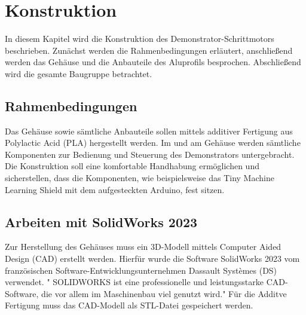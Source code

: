 %
%

\chapter{Konstruktion}
In diesem Kapitel wird die Konstruktion des Demonstrator-Schrittmotors beschrieben. Zunächst werden die Rahmenbedingungen erläutert, anschließend werden das Gehäuse und die Anbauteile des Aluprofils besprochen. Abschließend wird die gesamte Baugruppe betrachtet.

\section{Rahmenbedingungen}
Das Gehäuse sowie sämtliche Anbauteile sollen mittels additiver Fertigung aus Polylactic Acid (PLA) hergestellt werden. Im und am Gehäuse werden sämtliche Komponenten zur Bedienung und Steuerung des Demonstrators untergebracht. Die Konstruktion soll eine komfortable Handhabung ermöglichen und sicherstellen, dass die Komponenten, wie beispielsweise das Tiny Machine Learning Shield mit dem aufgesteckten Arduino, fest sitzen.

\section{Arbeiten mit SolidWorks 2023}
Zur Herstellung des Gehäuses muss ein 3D-Modell mittels Computer Aided Design (CAD) erstellt werden. Hierfür wurde die Software SolidWorks 2023 vom französischen Software-Entwicklungsunternehmen Dassault Systèmes (DS) verwendet. " SOLIDWORKS ist eine professionelle und leistungsstarke CAD-Software, die vor allem 
im Maschinenbau viel genutzt wird." \cite{Weber.2024} Für die Additve Fertigung muss das CAD-Modell als STL-Datei gespeichert werden. 

